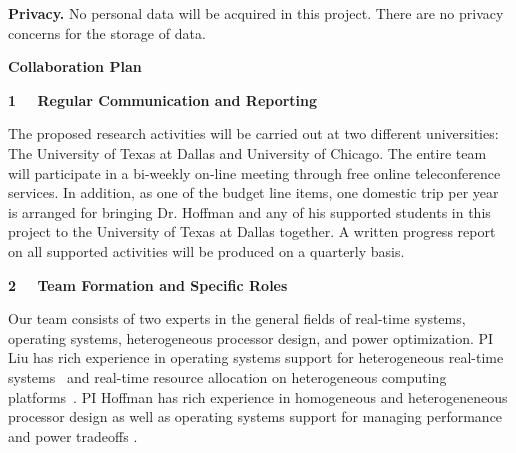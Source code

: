 \documentclass[10pt,letterpaper]{article}
\begin{document}
\vspace{1mm}
\noindent \textbf{Privacy.} No personal data will be acquired in this project. There are no privacy concerns for the storage of data.


\newpage
\begin{center}
\Large\textbf{Collaboration Plan}
\end{center} \normalsize

\vspace{6mm}
\large \noindent\textbf{1 \ \ Regular Communication and Reporting}\normalsize
\vspace{4mm}

\noindent The proposed research activities will be carried out at two different universities: The University of Texas at Dallas and University of Chicago. The entire team will participate in a bi-weekly on-line meeting through free online teleconference services. In addition, as one of the budget line items, one domestic trip per year is arranged for bringing Dr. Hoffman and any of his supported students in this project to the University of Texas at Dallas together. A written progress report on all supported activities will be produced on a quarterly basis.

\vspace{6mm}
\large \noindent\textbf{2 \ \ Team Formation and Specific Roles}\normalsize
\vspace{4mm}

\noindent Our team consists of two experts in the general fields of real-time systems, operating systems, heterogeneous processor design, and power optimization. PI Liu has rich experience in operating systems support for heterogeneous real-time systems~\cite{Liu12, GPES, zhou2015supporting, Zhou2014a} and real-time resource allocation on heterogeneous computing platforms~\cite{Tong14a, LiuRTSS14a, LiuRTSS15, Liu1, Liu2, Liu6, Liu7, Liu10, liu2014supporting, LiuRTSS14b, elliott1minimizing, Liu3, Liu4, Liu5, Liu9, Liu11, Liu13}.
PI Hoffman has rich experience in homogeneous\cite{raw1,raw2,raw3,tilera1,tilera2} and heterogeneneous \cite{ASAP,HPEC,ASAP2,ISSoC} processor design as well as operating systems support for managing performance and power tradeoffs \cite{LEO,POET,DynamicKnobs,JouleGuard,PTRADE,ICAC,TCST,HotPower,CPSNA}.
\end{document}
